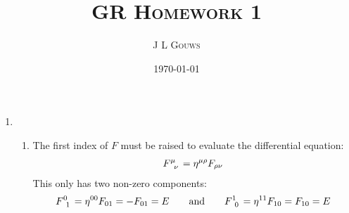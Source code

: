 \documentclass[12pt,a4]{article}
\title{
\textsc{GR Homework 1}
}
\author{\textsc{J L Gouws}
}
\date{\today
\\[1cm]}
\begin{document}
\thispagestyle{empty}

\maketitle

\begin{enumerate}
  \item
    \begin{enumerate}
      \item 
        The first index of $F$ must be raised to evaluate the differential equation:
        \begin{align*}
          \tensor{F}{^\mu_\nu} = \eta^{\mu\rho} F_{\rho\nu}
        \end{align*}
        This only has two non-zero components:
        \begin{align*}
          \tensor{F}{^0_1} = \eta^{00} F_{01} = - F_{01} = E \qquad \text{and} \qquad \tensor{F}{^1_0} = \eta^{11} F_{10} = F_{10} = E
        \end{align*}


\end{enumerate}
\end{enumerate}
\end{document}
